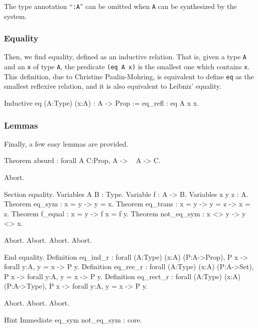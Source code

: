 The type annotation ``\texttt{:A}'' can be omitted when \texttt{A} can be
synthesized by the system.

\subsubsection[Equality]{Equality\label{Equality}
}

Then, we find equality, defined as an inductive relation. That is,
given a type \verb:A: and an \verb:x: of type \verb:A:, the
predicate \verb:(eq A x): is the smallest one which contains \verb:x:.
This definition, due to Christine Paulin-Mohring, is equivalent to
define \verb:eq: as the smallest reflexive relation, and it is also
equivalent to Leibniz' equality.


\begin{coq_example*}
Inductive eq (A:Type) (x:A) : A -> Prop :=
    eq_refl : eq A x x.
\end{coq_example*}

\subsubsection[Lemmas]{Lemmas\label{PreludeLemmas}}

Finally, a few easy lemmas are provided.


\begin{coq_example*}
Theorem absurd : forall A C:Prop, A -> ~ A -> C.
\end{coq_example*}
\begin{coq_eval}
Abort.
\end{coq_eval}
\begin{coq_example*}
Section equality.
Variables A B : Type.
Variable f : A -> B.
Variables x y z : A.
Theorem eq_sym : x = y -> y = x.
Theorem eq_trans : x = y -> y = z -> x = z.
Theorem f_equal : x = y -> f x = f y.
Theorem not_eq_sym : x <> y -> y <> x.
\end{coq_example*}
\begin{coq_eval}
Abort.
Abort.
Abort.
Abort.
\end{coq_eval}
\begin{coq_example*}
End equality.
Definition eq_ind_r :
  forall (A:Type) (x:A) (P:A->Prop), P x -> forall y:A, y = x -> P y.
Definition eq_rec_r :
  forall (A:Type) (x:A) (P:A->Set), P x -> forall y:A, y = x -> P y.
Definition eq_rect_r :
  forall (A:Type) (x:A) (P:A->Type), P x -> forall y:A, y = x -> P y.
\end{coq_example*}
\begin{coq_eval}
Abort.
Abort.
Abort.
\end{coq_eval}
\begin{coq_example*}
Hint Immediate eq_sym not_eq_sym : core.
\end{coq_example*}


